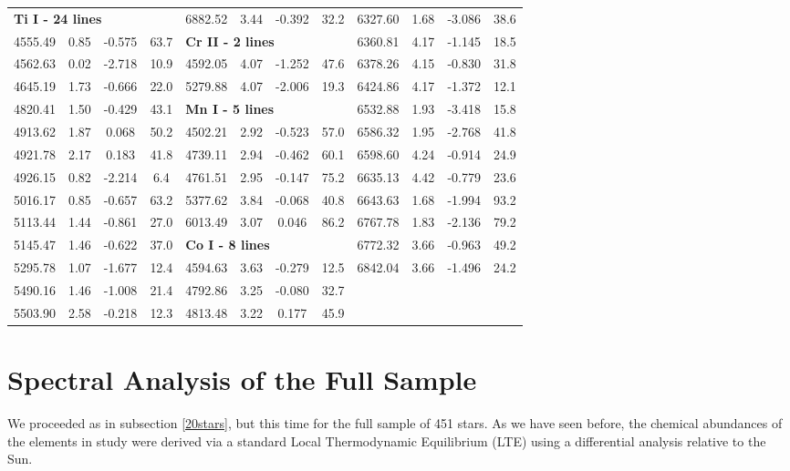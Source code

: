 \documentclass[dvips,12pt,a4paper]{report}
\begin{document}
{{\begin{table}[h!]
\begin{tabular}{c c c c | c c c c | c c c c}
\multicolumn{3}{l}{\textbf{Ti I - 24 lines}} & & 6882.52 & 3.44 & -0.392 &  32.2 & 6327.60 & 1.68 & -3.086 &  38.6 \\
4555.49 & 0.85 & -0.575 &  63.7 & \multicolumn{3}{l}{\textbf{Cr II - 2 lines}} &  & 6360.81 & 4.17 & -1.145 &  18.5 \\
4562.63 & 0.02 & -2.718 &  10.9 & 4592.05 & 4.07 & -1.252 &  47.6 & 6378.26 & 4.15 & -0.830 &  31.8 \\
4645.19 & 1.73 & -0.666 &  22.0 & 5279.88 & 4.07 & -2.006 &  19.3 & 6424.86 & 4.17 & -1.372 &  12.1 \\
4820.41 & 1.50 & -0.429 &  43.1 & \multicolumn{3}{l}{\textbf{Mn I - 5 lines}}  &  & 6532.88 & 1.93 & -3.418 &  15.8 \\
4913.62 & 1.87 &  0.068 &  50.2 & 4502.21 & 2.92 & -0.523 &  57.0 & 6586.32 & 1.95 & -2.768 &  41.8 \\
4921.78 & 2.17 &  0.183 &  41.8 & 4739.11 & 2.94 & -0.462 &  60.1 & 6598.60 & 4.24 & -0.914 &  24.9 \\
4926.15 & 0.82 & -2.214 &   6.4 & 4761.51 & 2.95 & -0.147 &  75.2 & 6635.13 & 4.42 & -0.779 &  23.6 \\
5016.17 & 0.85 & -0.657 &  63.2 & 5377.62 & 3.84 & -0.068 &  40.8 & 6643.63 & 1.68 & -1.994 &  93.2 \\
5113.44 & 1.44 & -0.861 &  27.0 & 6013.49 & 3.07 &  0.046 &  86.2 & 6767.78 & 1.83 & -2.136 &  79.2 \\
5145.47 & 1.46 & -0.622 &  37.0 & \multicolumn{3}{l}{\textbf{Co I - 8 lines}} &  & 6772.32 & 3.66 & -0.963 &  49.2 \\
5295.78 & 1.07 & -1.677 &  12.4 & 4594.63 & 3.63 & -0.279 &  12.5 & 6842.04 & 3.66 & -1.496 &  24.2 \\
5490.16 & 1.46 & -1.008 &  21.4 & 4792.86 & 3.25 & -0.080 &  32.7 \\
5503.90 & 2.58 & -0.218 &  12.3 & 4813.48 & 3.22 &  0.177 &  45.9 \\
\hline
\end{tabular}
\end {table}



\section {Spectral Analysis of the Full Sample}

We proceeded as in subsection \ref{20stars}, but this time for the full sample of 451 stars. As we have seen before, the chemical abundances of the elements in study were derived via a standard Local Thermodynamic Equilibrium (LTE) using a  differential analysis relative to the Sun.

}}
\end{document}
